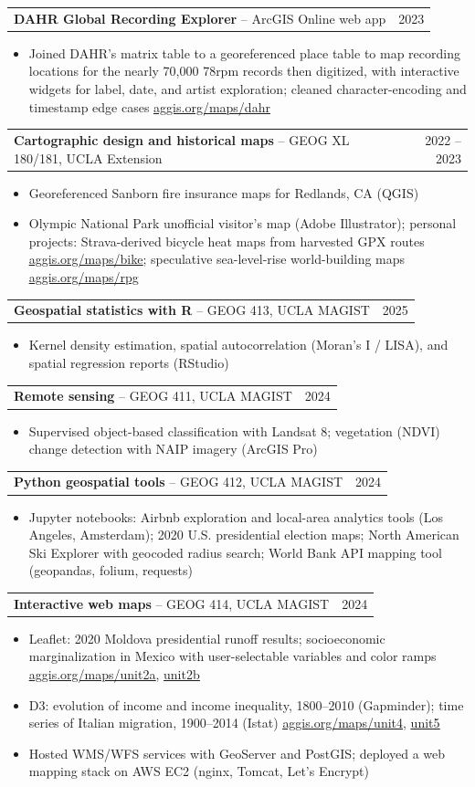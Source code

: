 \documentclass[letterpaper,10pt]{article}
\makeatletter
\newlength{\entrygap}   \setlength{\entrygap}{1pt}   %
\newlength{\groupgap}   \setlength{\groupgap}{4pt}   %
\newlength{\bulletgap}  \setlength{\bulletgap}{0pt}  %
\newlength{\groupindent}\setlength{\groupindent}{0.15in} %
\newcommand{\resumeItem}[1]{\item \small{#1}}
\newif\ifresumecont \resumecontfalse
\newcommand{\resumeProjectHeading}[2]{%
  \vspace{\entrygap}\item
    \begin{tabular*}{0.97\textwidth}[t]{l@{\extracolsep{\fill}}r}
      \small#1 & \small#2 \\
    \end{tabular*}%
}
\newcommand{\cvGroupHeading}[1]{%
  \resumecontfalse
  \vspace{\groupgap}\item[]\hspace*{-\groupindent}{\small\bfseries\scshape #1}%
}
\newcommand{\resumeItemListStart}{%
  \begin{itemize}[leftmargin=\groupindent, itemsep=\bulletgap,
                  parsep=0pt, topsep=1pt, partopsep=0pt]}
\newcommand{\resumeItemListEnd}{\resumecontfalse\end{itemize}}
\newcommand{\lnk}[2]{{\scriptsize\href{#1}{\underline{#2}}}}
\makeatother
\begin{document}
    \resumeProjectHeading
      {\textbf{DAHR Global Recording Explorer} -- ArcGIS Online web app}{2023}
      \resumeItemListStart
        \resumeItem{Joined DAHR's matrix table to a georeferenced place table to map recording locations for the nearly 70,000 78rpm records then digitized, with interactive widgets for label, date, and artist exploration; cleaned character-encoding and timestamp edge cases \lnk{https://aggis.org/maps/dahr/}{aggis.org/maps/dahr}}
      \resumeItemListEnd


    \cvGroupHeading{Topics}

    \resumeProjectHeading
      {\textbf{Cartographic design and historical maps} -- GEOG XL 180/181, UCLA Extension}{2022 -- 2023}
      \resumeItemListStart
        \resumeItem{Georeferenced Sanborn fire insurance maps for Redlands, CA (QGIS)}
        \resumeItem{Olympic National Park unofficial visitor's map (Adobe Illustrator); personal projects: Strava-derived bicycle heat maps from harvested GPX routes \lnk{https://aggis.org/maps/bike/}{aggis.org/maps/bike}; speculative sea-level-rise world-building maps \lnk{https://aggis.org/maps/rpg/}{aggis.org/maps/rpg}}
      \resumeItemListEnd

    \resumeProjectHeading
      {\textbf{Geospatial statistics with R} -- GEOG 413, UCLA MAGIST}{2025}
      \resumeItemListStart
        \resumeItem{Kernel density estimation, spatial autocorrelation (Moran's I / LISA), and spatial regression reports (RStudio)}
      \resumeItemListEnd

    \resumeProjectHeading
      {\textbf{Remote sensing} -- GEOG 411, UCLA MAGIST}{2024}
      \resumeItemListStart
        \resumeItem{Supervised object-based classification with Landsat 8; vegetation (NDVI) change detection with NAIP imagery (ArcGIS Pro)}
      \resumeItemListEnd

    \resumeProjectHeading
      {\textbf{Python geospatial tools} -- GEOG 412, UCLA MAGIST}{2024}
      \resumeItemListStart
        \resumeItem{Jupyter notebooks: Airbnb exploration and local-area analytics tools (Los Angeles, Amsterdam); 2020 U.S. presidential election maps; North American Ski Explorer with geocoded radius search; World Bank API mapping tool (geopandas, folium, requests)}
      \resumeItemListEnd

    \resumeProjectHeading
      {\textbf{Interactive web maps} -- GEOG 414, UCLA MAGIST}{2024}
      \resumeItemListStart
        \resumeItem{Leaflet: 2020 Moldova presidential runoff results; socioeconomic marginalization in Mexico with user-selectable variables and color ramps \lnk{https://aggis.org/maps/unit2a/}{aggis.org/maps/unit2a}, \lnk{https://aggis.org/maps/unit2b/}{unit2b}}
        \resumeItem{D3: evolution of income and income inequality, 1800--2010 (Gapminder); time series of Italian migration, 1900--2014 (Istat) \lnk{https://aggis.org/maps/unit4/}{aggis.org/maps/unit4}, \lnk{https://aggis.org/maps/unit5/}{unit5}}
        \resumeItem{Hosted WMS/WFS services with GeoServer and PostGIS; deployed a web mapping stack on AWS EC2 (nginx, Tomcat, Let's Encrypt)}
      \resumeItemListEnd
\end{document}

